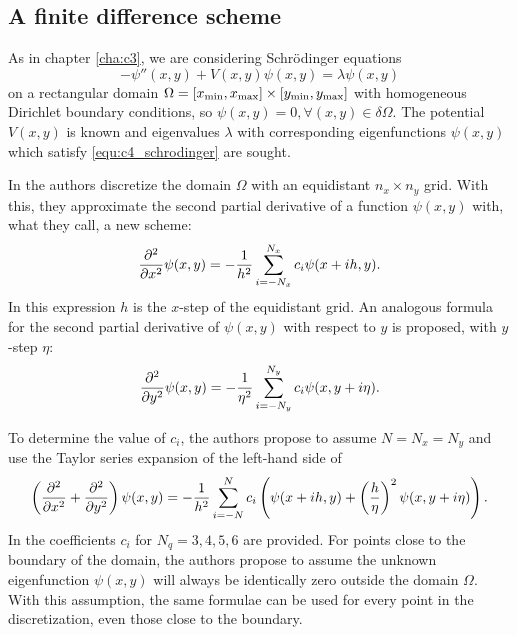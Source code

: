 \subsection{A finite difference scheme}

As in chapter \ref{cha:c3}, we are considering Schrödinger equations
\begin{equation}\label{equ:c4_schrodinger}
    -\psi''(x, y) + V(x, y) \psi(x, y) = \lambda \psi(x, y)
\end{equation}
on a rectangular domain $\Omega = [{x_{\text{min}}}, {x_{\text{max}}}] \times [{y_{\text{min}}}, {y_{\text{max}}}]$ with homogeneous Dirichlet boundary conditions, so $\psi(x, y) = 0, \forall (x, y) \in \delta \Omega$. The potential $V(x, y)$ is known and eigenvalues $\lambda$ with corresponding eigenfunctions $\psi(x, y)$ which satisfy \eqref{equ:c4_schrodinger} are sought.

In \cite{wang_new_2009} the authors discretize the domain $\Omega$ with an equidistant $n_x \times n_y$ grid. With this, they approximate the second partial derivative of a function $\psi(x, y)$ with, what they call, a new scheme:
$$
    {\pdv[2]{}{x}}\psi(x, y) = -\frac{1}{h^2}\sum_{i=-N_x}^{N_x} c_i \psi(x + ih, y)\text{.}
$$
In this expression $h$ is the $x$-step of the equidistant grid. An analogous formula for the second partial derivative of $\psi(x, y)$ with respect to $y$ is proposed, with $y$-step $\eta$:
$$
    {\pdv[2]{}{y}}\psi(x, y) = -\frac{1}{\eta^2}\sum_{i=-N_y}^{N_y} c_i \psi(x, y + i\eta)\text{.}
$$

To determine the value of $c_i$, the authors propose to assume $N = N_x = N_y$ and use the Taylor series expansion of the left-hand side of
$$
    \left({\pdv[2]{}{x}} + {\pdv[2]{}{y}}\right)\psi(x, y) = -\frac{1}{h^2} \sum_{i=-N}^{N} c_i \left(\psi(x+ih, y) + \left(\frac{h}{\eta}\right)^2\psi(x, y+i\eta)\right)\text{.}
$$
In \cite{wang_new_2009} the coefficients $c_i$ for $N_q = 3, 4, 5, 6$ are provided. For points close to the boundary of the domain, the authors propose to assume the unknown eigenfunction $\psi(x, y)$ will always be identically zero outside the domain $\Omega$. With this assumption, the same formulae can be used for every point in the discretization, even those close to the boundary.

